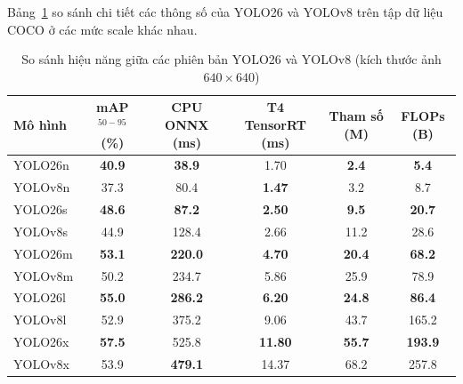 Bảng~\ref{tab:yolo26_vs_yolov8} so sánh chi tiết các thông số của YOLO26 và YOLOv8 trên tập dữ liệu COCO ở các mức scale khác nhau.

\begin{table}[H]
    \centering
    \caption{So sánh hiệu năng giữa các phiên bản YOLO26 và YOLOv8 (kích thước ảnh $640\times 640$)}
    \label{tab:yolo26_vs_yolov8}
    \begin{tabular}{lccccc}
        \hline
        \textbf{Mô hình} & \textbf{mAP}$^{50-95}$ (\%) & \textbf{CPU ONNX} (ms) & \textbf{T4 TensorRT} (ms) & \textbf{Tham số} (M) & \textbf{FLOPs} (B) \\
        \hline
        YOLO26n          & \textbf{40.9}               & \textbf{38.9}          & 1.70                      & \textbf{2.4}         & \textbf{5.4}       \\
        YOLOv8n          & 37.3                        & 80.4                   & \textbf{1.47}             & 3.2                  & 8.7                \\
        \hline
        YOLO26s          & \textbf{48.6}               & \textbf{87.2}          & \textbf{2.50}             & \textbf{9.5}         & \textbf{20.7}      \\
        YOLOv8s          & 44.9                        & 128.4                  & 2.66                      & 11.2                 & 28.6               \\
        \hline
        YOLO26m          & \textbf{53.1}               & \textbf{220.0}         & \textbf{4.70}             & \textbf{20.4}        & \textbf{68.2}      \\
        YOLOv8m          & 50.2                        & 234.7                  & 5.86                      & 25.9                 & 78.9               \\
        \hline
        YOLO26l          & \textbf{55.0}               & \textbf{286.2}         & \textbf{6.20}             & \textbf{24.8}        & \textbf{86.4}      \\
        YOLOv8l          & 52.9                        & 375.2                  & 9.06                      & 43.7                 & 165.2              \\
        \hline
        YOLO26x          & \textbf{57.5}               & 525.8                  & \textbf{11.80}            & \textbf{55.7}        & \textbf{193.9}     \\
        YOLOv8x          & 53.9                        & \textbf{479.1}         & 14.37                     & 68.2                 & 257.8              \\
        \hline
    \end{tabular}
\end{table}

